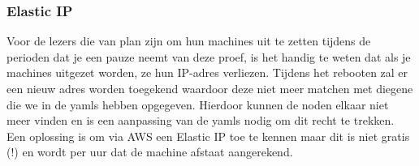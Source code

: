 \documentclass{article}
\begin{document}
	\subsubsection{Elastic IP}
	Voor de lezers die van plan zijn om hun machines uit te zetten tijdens de perioden dat je een pauze neemt van deze proef, is het handig te weten dat als je machines uitgezet worden, ze hun IP-adres verliezen. Tijdens het rebooten zal er een nieuw adres worden toegekend waardoor deze niet meer matchen met diegene die we in de yamls hebben opgegeven. Hierdoor kunnen de noden elkaar niet meer vinden en is een aanpassing van de yamls nodig om dit recht te trekken. Een oplossing is om via AWS een Elastic IP toe te kennen maar dit is niet gratis (!) en wordt per uur dat de machine afstaat aangerekend.
\end{document}
